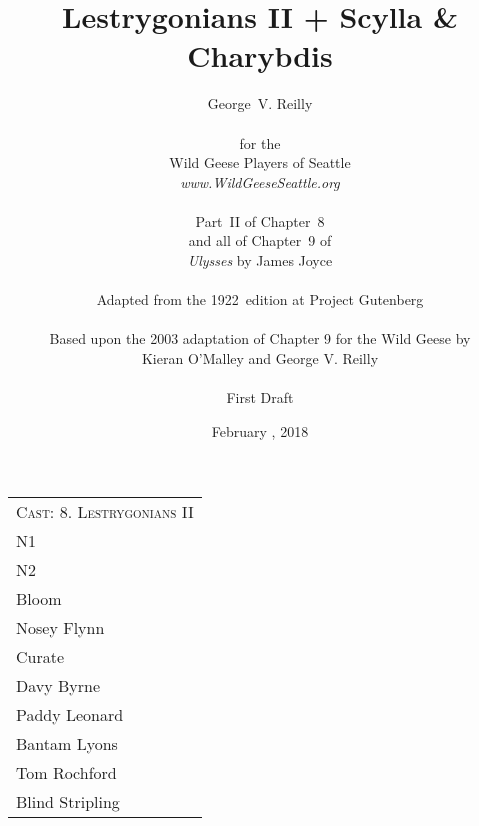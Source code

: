 



\title{\Huge Lestrygonians II + Scylla \& Charybdis}
\author{George~V. Reilly\\
\\
{\small for the}\\
Wild Geese Players of Seattle\\
{\emph{www.WildGeeseSeattle.org}}\\
\\
{\small Part~II of Chapter~8}\\
{\small and all of Chapter~9 of}\\
{\small \emph{Ulysses} by James Joyce}\\
\\
{\small Adapted from the 1922~edition at Project Gutenberg}
\\
\\
{\small Based upon the 2003 adaptation of Chapter 9 for the Wild Geese by}\\
{\small Kieran O'Malley and George V. Reilly}\\
\\
{\small First Draft}}
\date{February , 2018}
\raggedbottom



\maketitle
\thispagestyle{empty}
\pagebreak


\begin{tabular}{l p{5cm} l p{5cm}}
    \multicolumn{4}{c}{\Large \textsc{Cast: 8. Lestrygonians II}} \\
N1 \\
N2 \\
Bloom \\
Nosey Flynn \\
Curate \\
Davy Byrne \\
Paddy Leonard \\
Bantam Lyons \\
Tom Rochford \\
Blind Stripling \\
\end{tabular}

\bigskip
\bigskip

